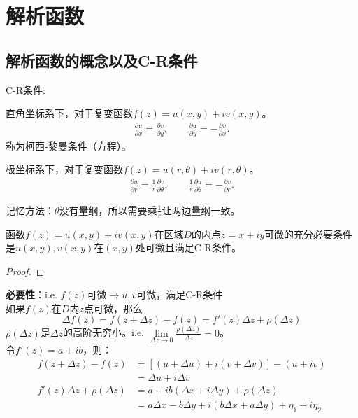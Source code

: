 \documentclass[cn,hazy,blue,14pt,normal]{elegantnote}
\numberwithin{equation}{section}
\begin{document}
\newpage
\section{解析函数}
\newpage
\subsection{解析函数的概念以及C-R条件}

\begin{definition}
	C-R条件:
\end{definition}
直角坐标系下，对于复变函数$f(z)=u(x,y)+iv(x,y)$。
\begin{gather}
	\frac{\partial u}{\partial x}=\frac{\partial v}{\partial y},\qquad
	\frac{\partial u}{\partial y}=-\frac{\partial v}{\partial x}.
\end{gather}
称为柯西-黎曼条件（方程）。
\par 极坐标系下，对于复变函数$f(z)=u(r,\theta)+iv(r,\theta)$。
\begin{gather}
	\frac{\partial u}{\partial r}=\frac{1}{r}\frac{\partial v}{\partial \theta},\qquad
	\frac{1}{r}\frac{\partial u}{\partial \theta}=-\frac{\partial v}{\partial r}.
\end{gather}
\begin{note}
	记忆方法：$\theta$没有量纲，所以需要乘$\frac{1}{r}$让两边量纲一致。
\end{note}
\begin{theorem}
	函数$f(z)=u(x,y)+iv(x,y)$在区域$D$的内点$z=x+iy$可微的充分必要条件是$u(x,y),v(x,y)$在$(x,y)$处可微且满足C-R条件。
\end{theorem}
\begin{proof}

\end{proof}
\textbf{必要性}：i.e. $f(z)$可微$\to u,v $可微，满足C-R条件\\
如果$f(z)$在$D$内$z$点可微，那么
$$
	\Delta f(z)=f(z+\Delta z)-f(z)=f'(z)\Delta z+\rho(\Delta z)
$$
$\rho(\Delta z)$是$\Delta z$的高阶无穷小。i.e. $\lim\limits_{\Delta z\to0}\frac{\rho(\Delta z)}{\Delta z}=0$。\\ 
令$f'(z)=a+ib$，则：
\begin{align*}
	f(z+\Delta z)-f(z)&=[(u+\Delta u)+i(v+\Delta v)]-(u+iv)\\
	&=\Delta u + i \Delta v\\
	f'(z)\Delta z+\rho(\Delta z)&=a+ib(\Delta x+i\Delta y)+\rho(\Delta z)\\
	&=a\Delta x-b\Delta y+i(b\Delta x+a\Delta y)+\eta_1 + i\eta_2
\end{align*}
\end{document}

